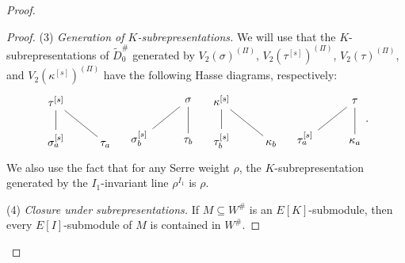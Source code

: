 \documentclass[a4paper,10pt,twoside]{amsart}
\theoremstyle{definition}
\numberwithin{equation}{section}
\begin{document}
\begin{proof}
\begin{proof}
 
\medskip

\noindent
(3) \emph{Generation of $K$-subrepresentations.}
We will use that the $K$-subrepresentations of
\(\widetilde D_0^\#\) generated by
\(V_2(\sigma)^{(\Pi)}\),
\(V_2(\tau^{[s]})^{(\Pi)}\),
\(V_2(\tau)^{(\Pi)}\), and
\(V_2(\kappa^{[s]})^{(\Pi)}\)
have the following Hasse diagrams, respectively:
\[
\begin{tikzcd}
	{\tau^{[s]}} & \\
	{\sigma^{[s]}_a} & {\tau_a}
	\arrow[no head, from=1-1, to=2-1]
	\arrow[no head, from=1-1, to=2-2]
\end{tikzcd}
\quad
\begin{tikzcd}
	& \sigma \\
	{\sigma^{[s]}_b} & {\tau_b}
	\arrow[no head, from=1-2, to=2-1]
	\arrow[no head, from=1-2, to=2-2]
\end{tikzcd}
\quad
\begin{tikzcd}
	{\kappa^{[s]}} & \\
	{\tau^{[s]}_b} & {\kappa_b}
	\arrow[no head, from=1-1, to=2-1]
	\arrow[no head, from=1-1, to=2-2]
\end{tikzcd}
\quad
\begin{tikzcd}
	& \tau \\
	{\tau^{[s]}_a} & {\kappa_a}
	\arrow[no head, from=1-2, to=2-1]
	\arrow[no head, from=1-2, to=2-2]
\end{tikzcd}.
\]
We also use the fact that for any Serre weight $\rho$, the $K$-subrepresentation generated by the $I_1$-invariant line $\rho^{I_1}$ is $\rho$.

\medskip

\noindent
(4) \emph{Closure under subrepresentations.} 
If \(M\subseteq W^\#\) is an \(E[K]\)-submodule, then every \(E[I]\)-submodule of \(M\) is contained in \(W^\#\).


\end{proof}
\end{proof}
\end{document}
